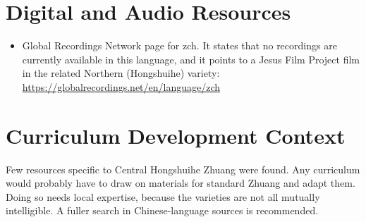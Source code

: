 \documentclass[12pt]{article}
\begin{document}
\section{Digital and Audio Resources}
\begin{itemize}
\item Global Recordings Network page for zch. It states that no recordings are currently available in this language, and it points to a Jesus Film Project film in the related Northern (Hongshuihe) variety: \url{https://globalrecordings.net/en/language/zch}
\end{itemize}

\section{Curriculum Development Context}
Few resources specific to Central Hongshuihe Zhuang were found. Any curriculum would probably have to draw on materials for standard Zhuang and adapt them. Doing so needs local expertise, because the varieties are not all mutually intelligible. A fuller search in Chinese-language sources is recommended.
\end{document}
